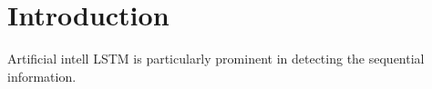 \section{Introduction}
Artificial intell
LSTM is particularly prominent in detecting the sequential information. 